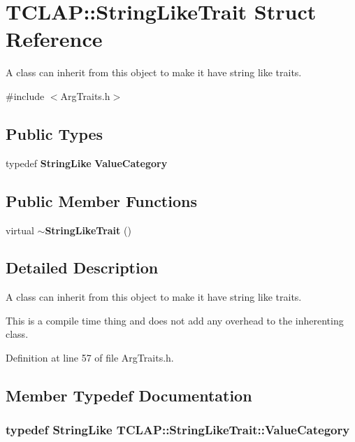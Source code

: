 \section{T\+C\+L\+A\+P\+:\+:String\+Like\+Trait Struct Reference}
\label{structTCLAP_1_1StringLikeTrait}


A class can inherit from this object to make it have string like traits.  




{\ttfamily \#include $<$Arg\+Traits.\+h$>$}

\subsection*{Public Types}
\begin{DoxyCompactItemize}
\item 
typedef {\bf String\+Like} {\bf Value\+Category}
\end{DoxyCompactItemize}
\subsection*{Public Member Functions}
\begin{DoxyCompactItemize}
\item 
virtual {\bf $\sim$\+String\+Like\+Trait} ()
\end{DoxyCompactItemize}


\subsection{Detailed Description}
A class can inherit from this object to make it have string like traits. 

This is a compile time thing and does not add any overhead to the inherenting class. 

Definition at line 57 of file Arg\+Traits.\+h.



\subsection{Member Typedef Documentation}
\subsubsection[{Value\+Category}]{\setlength{\rightskip}{0pt plus 5cm}typedef {\bf String\+Like} {\bf T\+C\+L\+A\+P\+::\+String\+Like\+Trait\+::\+Value\+Category}}\label{structTCLAP_1_1StringLikeTrait_a7a081c80b731414dcad1b50cf80b7433}


